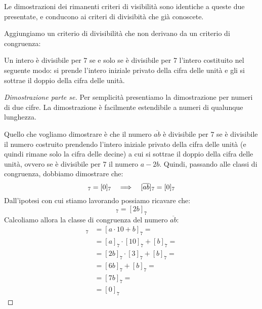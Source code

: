 Le dimostrazioni dei rimanenti criteri di visibilità sono identiche a queste due presentate, e conducono ai criteri di divisibità che già conoscete.

Aggiungiamo un criterio di divisibilità che non derivano da un criterio di congruenza:

\begin{mdframed}
    \begin{teorema}
        Un intero è divisibile per 7 se e solo se è divisibile per 7 l'intero costituito nel seguente modo: si prende l'intero iniziale privato della cifra delle unità e gli si sottrae il doppio della cifra delle unità.
    \end{teorema}
    \begin{proof}[Dimostrazione parte se]
        Per semplicità presentiamo la dimostrazione per numeri di due cifre. La dimostrazione è facilmente estendibile a numeri di qualunque lunghezza.

        Quello che vogliamo dimostrare è che il numero $\overline{ab}$ è divisibile per 7 se è divisibile il numero costruito prendendo l'intero iniziale privato della cifra delle unità (e quindi rimane solo la cifra delle decine) a cui si sottrae il doppio della cifra delle unità, ovvero se è divisibile per 7 il numero $a - 2b$. Quindi, passando alle classi di congruenza, dobbiamo dimostrare che:
        \begin{equation*}
            [a - 2b]_7 = [0]_7 \allora [\overline{ab}]_7 = [0]_7
        \end{equation*}
        Dall'ipotesi con cui stiamo lavorando possiamo ricavare che:
        \begin{equation*}
            [a]_7 = [2b]_7
        \end{equation*}
        Calcoliamo allora la classe di congruenza del numero $\overline{ab}$:
        \begin{align*}
            [\overline{ab}]_7 &= [a \cdot 10 + b]_7 = \\
            &= [a]_7 \cdot [10]_7 + [b]_7 =\\
            &= [2b]_7 \cdot [3]_7 + [b]_7 =\\
            &= [6b]_7 + [b]_7 =\\
            &= [7b]_7 =\\
            &= [0]_7
        \end{align*}
        
    \end{proof}
\end{mdframed}



